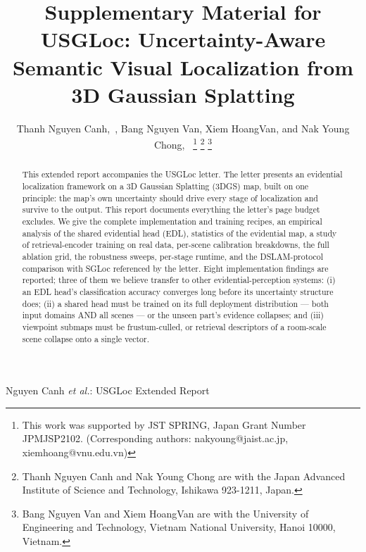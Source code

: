 \documentclass[journal]{IEEEtran}
\newcommand{\method}{USGLoc}
\begin{document}
\title{Supplementary Material for \\ \method{}: Uncertainty-Aware Semantic
Visual Localization from 3D Gaussian Splatting}

\author{Thanh Nguyen Canh,~,
Bang Nguyen Van, Xiem HoangVan, and Nak Young Chong,~
\thanks{This work was supported by JST SPRING, Japan Grant Number JPMJSP2102.
(Corresponding authors: nakyoung@jaist.ac.jp, xiemhoang@vnu.edu.vn)}
\thanks{Thanh Nguyen Canh and Nak Young Chong are with the Japan Advanced
Institute of Science and Technology, Ishikawa 923-1211, Japan.}
\thanks{Bang Nguyen Van and Xiem HoangVan are with the University of
Engineering and Technology, Vietnam National University, Hanoi 10000, Vietnam.}}

%
{Nguyen Canh \MakeLowercase{\textit{et al.}}: \method{} Extended Report}

\maketitle

\begin{abstract}
This extended report accompanies the \method{} letter. The letter presents an
evidential localization framework on a 3D Gaussian Splatting (3DGS) map,
built on one principle: the map's own uncertainty should drive every stage of
localization and survive to the output. This report documents everything the
letter's page budget excludes. We give the complete implementation and
training recipes, an empirical analysis of the shared evidential head (EDL),
statistics of the evidential map, a study of retrieval-encoder training on
real data, per-scene calibration breakdowns, the full ablation grid, the
robustness sweeps, per-stage runtime, and the DSLAM-protocol comparison with
SGLoc referenced by the letter. Eight implementation findings are reported; three of them we believe transfer to other evidential-perception systems:
(i) an EDL head's classification accuracy converges long before its
uncertainty structure does; (ii) a shared head must be trained on its full
deployment distribution --- both input domains AND all scenes --- or the
unseen part's evidence collapses; and (iii) viewpoint submaps must be
frustum-culled, or retrieval descriptors of a room-scale scene collapse onto
a single vector.
\end{abstract}
\end{document}
